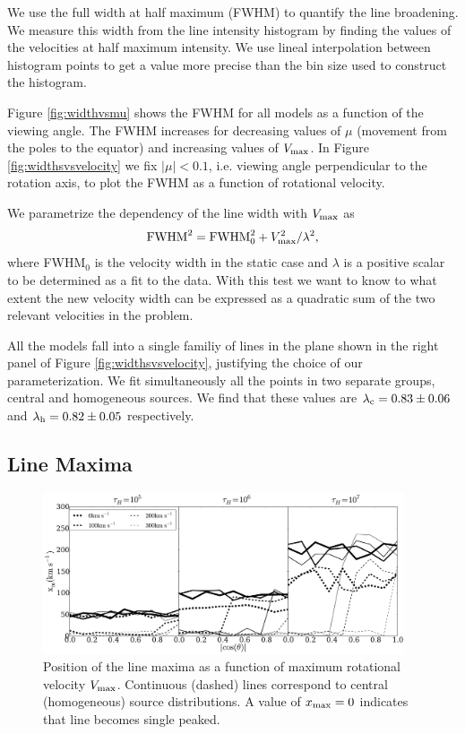 \documentclass{emulateapj}
\begin{document}
We use the full width at half maximum (FWHM) to quantify the line
broadening. 
We measure this width from the line intensity histogram by finding the
values of the velocities at half maximum intensity.
We use lineal interpolation between histogram points to get a value
more precise than the bin size used to construct the histogram. 

Figure \ref{fig:widthvsmu} shows the FWHM for all models as a function
of the viewing angle. 
The FWHM increases for decreasing values of $\mu$ (movement from the
poles to the equator) and increasing values of $V_{\rm max}$. 
In Figure
\ref{fig:widthsvsvelocity} we fix $|\mu|<0.1$, i.e. viewing angle
perpendicular to the rotation axis, to plot the FWHM as a function of
rotational velocity.  


We parametrize the dependency of the line width with  $V_{\rm max}$ as
%
\begin{equation}
 {\rm FWHM}^2 = {\rm FWHM}_{0}^2 + V_{\rm max}^2/\lambda^2,
\label{eq:fwhm}
\end{equation}
%
where FWHM$_{0}$ is the velocity width in the static case and $\lambda$ 
is a positive scalar to be determined as a fit to the data.  
With this test we want to know to what extent the new velocity width can be
expressed as a quadratic sum of the two relevant velocities in the
problem. 

All the models fall into a single familiy of lines in the plane shown
in the right panel of Figure \ref{fig:widthsvsvelocity}, justifying
the choice of our parameterization.
We fit simultaneously all the points in two separate groups, central
and homogeneous sources.
We find that these values are $\lambda_{\rm c} = 0.83 \pm 0.06$ and
$\lambda_{\rm    h}= 0.82\pm 0.05$ respectively.    


\subsection{Line Maxima}
\label{sec:maxima}

\begin{figure}
\begin{center}
  \includegraphics[width=0.95\textwidth]{f8.pdf}
\end{center}
\caption{Position of the line maxima as a function of maximum
  rotational   velocity $V_{\rm max}$. Continuous (dashed) lines
  correspond to   central (homogeneous) source distributions. A value
  of $x_{\rm     max}=0$ indicates that line becomes single
  peaked. \label{fig:maximumvsvelocity}}
\end{figure}
\end{document}
